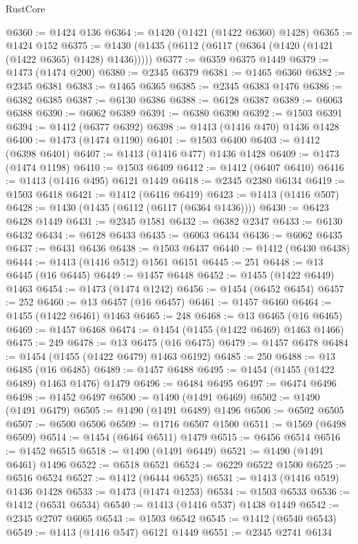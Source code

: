 \begin{lexlean}{RustCore}
\begin{coremodule}
@6360 := @1424 @136
@6364 := @1420 (@1421 (@1422 @6360) @1428)
@6365 := @1424 @152
@6375 := @1430 (@1435 (@6112 (@6117 (@6364 (@1420 (@1421 (@1422 @6365) @1428) @1436)))))
@6377 := @6359 @6375 @1449
@6379 := @1473 (@1474 @200)
@6380 := @2345 @6379
@6381 := @1465 @6360
@6382 := @2345 @6381
@6383 := @1465 @6365
@6385 := @2345 @6383 @1476
@6386 := @6382 @6385
@6387 := @6130 @6386
@6388 := @6128 @6387
@6389 := @6063 @6388
@6390 := @6062 @6389
@6391 := @6380 @6390
@6392 := @1503 @6391
@6394 := @1412 (@6377 @6392)
@6398 := @1413 (@1416 @470) @1436 @1428
@6400 := @1473 (@1474 @1190)
@6401 := @1503 @6400
@6403 := @1412 (@6398 @6401)
@6407 := @1413 (@1416 @477) @1436 @1428
@6409 := @1473 (@1474 @1198)
@6410 := @1503 @6409
@6412 := @1412 (@6407 @6410)
@6416 := @1413 (@1416 @495) @6121 @1449
@6418 := @2345 @2380 @6134
@6419 := @1503 @6418
@6421 := @1412 (@6416 @6419)
@6423 := @1413 (@1416 @507)
@6428 := @1430 (@1435 (@6112 (@6117 (@6364 @1436))))
@6430 := @6423 @6428 @1449
@6431 := @2345 @1581
@6432 := @6382 @2347
@6433 := @6130 @6432
@6434 := @6128 @6433
@6435 := @6063 @6434
@6436 := @6062 @6435
@6437 := @6431 @6436
@6438 := @1503 @6437
@6440 := @1412 (@6430 @6438)
@6444 := @1413 (@1416 @512) @1561 @6151
@6445 := 251
@6448 := @13 @6445 (@16 @6445)
@6449 := @1457 @6448
@6452 := @1455 (@1422 @6449) @1463
@6454 := @1473 (@1474 @1242)
@6456 := @1454 (@6452 @6454)
@6457 := 252
@6460 := @13 @6457 (@16 @6457)
@6461 := @1457 @6460
@6464 := @1455 (@1422 @6461) @1463
@6465 := 248
@6468 := @13 @6465 (@16 @6465)
@6469 := @1457 @6468
@6474 := @1454 (@1455 (@1422 @6469) @1463 @1466)
@6475 := 249
@6478 := @13 @6475 (@16 @6475)
@6479 := @1457 @6478
@6484 := @1454 (@1455 (@1422 @6479) @1463 @6192)
@6485 := 250
@6488 := @13 @6485 (@16 @6485)
@6489 := @1457 @6488
@6495 := @1454 (@1455 (@1422 @6489) @1463 @1476) @1479
@6496 := @6484 @6495
@6497 := @6474 @6496
@6498 := @1452 @6497
@6500 := @1490 (@1491 @6469)
@6502 := @1490 (@1491 @6479)
@6505 := @1490 (@1491 @6489) @1496
@6506 := @6502 @6505
@6507 := @6500 @6506
@6509 := @1716 @6507 @1500
@6511 := @1569 (@6498 @6509)
@6514 := @1454 (@6464 @6511) @1479
@6515 := @6456 @6514
@6516 := @1452 @6515
@6518 := @1490 (@1491 @6449)
@6521 := @1490 (@1491 @6461) @1496
@6522 := @6518 @6521
@6524 := @6229 @6522 @1500
@6525 := @6516 @6524
@6527 := @1412 (@6444 @6525)
@6531 := @1413 (@1416 @519) @1436 @1428
@6533 := @1473 (@1474 @1253)
@6534 := @1503 @6533
@6536 := @1412 (@6531 @6534)
@6540 := @1413 (@1416 @537) @1438 @1449
@6542 := @2345 @2707 @6065
@6543 := @1503 @6542
@6545 := @1412 (@6540 @6543)
@6549 := @1413 (@1416 @547) @6121 @1449
@6551 := @2345 @2741 @6134

\end{coremodule}
\end{lexlean}
